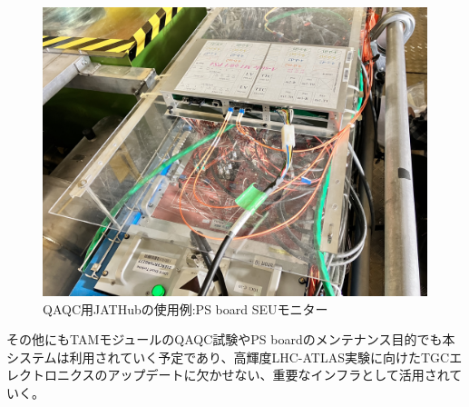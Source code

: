 \begin{figure}
\centering
\includegraphics[width=16cm]{fig/QAQC/JATHubSEU.JPG}
\caption[QAQC用JATHubの使用例:PS board SEUモニター]{QAQC用JATHubの使用例:PS board SEUモニター\cite{mt_hashimoto}}
\label{JATHubSEU}
\end{figure}

その他にもTAMモジュールのQAQC試験やPS boardのメンテナンス目的でも本システムは利用されていく予定であり、高輝度LHC-ATLAS実験に向けたTGCエレクトロニクスのアップデートに欠かせない、重要なインフラとして活用されていく。